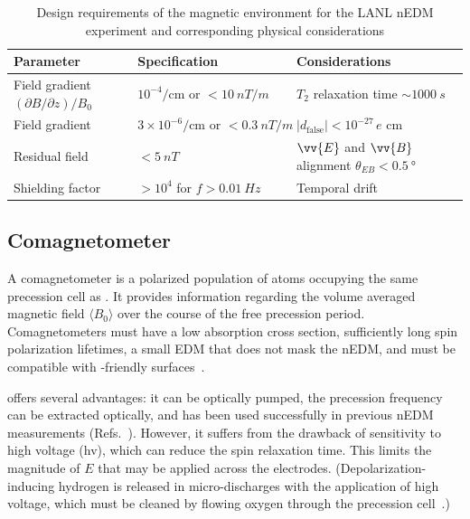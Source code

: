 \begin{table}
\centering
\caption{Design requirements of the magnetic environment for the LANL nEDM experiment and corresponding physical considerations}\label{tb:lanl_magnetic_design}
\begin{tabular}{
    lll
}
\toprule
Parameter		& Specification				& Considerations	\\
\midrule
Field gradient $(\partial B/\partial z)/B_0$	& $10^{-4}/\text{cm or } <\qty{10}{nT\per m}$ & $T_2$ relaxation time $\sim\qty{1000}{s}$\\
Field gradient  & $3\times 10^{-6}/\text{cm or }<\qty{0.3}{nT\per m}$ & $|d_\text{false}|<10^{-27}\,e\text{ cm}$ \\
Residual field & $<\qty{5}{nT}$ & $\vv{E}$ and $\vv{B}$ alignment $\theta_{EB}<\qty{0.5}{\degree}$ \\
Shielding factor & $>10^4$ for $f>\qty{0.01}{Hz}$ & Temporal drift \\
\bottomrule
\end{tabular}
\end{table}


\subsection
{
    \texorpdfstring{\hg Comagnetometer}
                    {199Hg Comagnetometer}\label{sec:199hg_comag}
}


A comagnetometer is a polarized population of atoms occupying the same precession cell as \ucn. It provides information regarding the volume averaged magnetic field $\langle B_0 \rangle$ over the course of the free precession period. Comagnetometers must have a low \ucn absorption cross section, sufficiently long spin polarization lifetimes, a small EDM that does not mask the nEDM, and must be compatible with \ucn-friendly surfaces~\cite{golubUCN}.

\hg offers several advantages: it can be optically pumped, the precession frequency can be extracted optically, and has been used successfully in previous nEDM measurements (Refs.~\cite{BAK06, ABE20}). However, it suffers from the drawback of sensitivity to high voltage (\acrshort*{hv}), which can reduce the spin relaxation time. This limits the magnitude of $E$ that may be applied across the electrodes. (Depolarization-inducing hydrogen is released in micro-discharges with the application of high voltage, which must be cleaned by flowing oxygen through the precession cell~\cite{baker_apparatus_2014}.)

